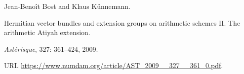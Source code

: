 Jean-Beno{\^i}t Bost and Klaus K{\"u}nnemann.

\newblock Hermitian vector bundles and extension groups on arithmetic schemes
  {II}. {The} arithmetic {Atiyah} extension.

\newblock \emph{Ast{\'e}risque}, 327: 361--424, 2009.

\newblock URL \url{https://www.numdam.org/article/AST_2009__327__361_0.pdf}.
